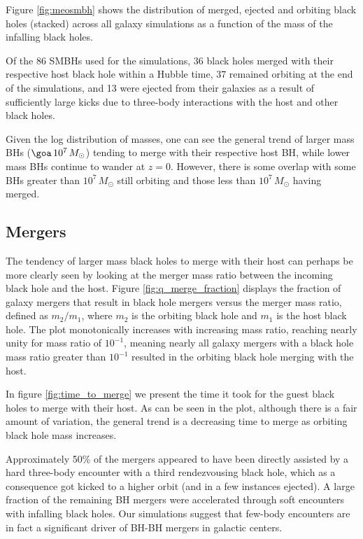 \documentclass[fleqn,usenatbib,useAMS]{mnras}
\begin{document}
Figure \ref{fig:meosmbh} shows the distribution of merged, ejected and orbiting black holes (stacked) across all galaxy simulations as a function of the mass of the infalling black holes.

Of the 86 SMBHs used for the simulations, 36 black holes merged with their respective host black hole within a Hubble time, 37 remained orbiting at the end of the simulations, and 13 were ejected from their galaxies as a result of sufficiently large kicks due to three-body interactions with the host and other black holes.

Given the log distribution of masses, one can see the general trend of larger mass BHs ($\goa\, 10^7\, M_{\odot}$) tending to merge with their respective host BH, while lower mass BHs continue to wander at $z=0$.  However, there is some overlap with some BHs greater than $10^7\, M_{\odot}$ still orbiting and those less than $10^7\, M_{\odot}$ having merged.

\subsection{Mergers}\label{sec:mergers}
The tendency of larger mass black holes to merge with their host can perhaps be more clearly seen by looking at the merger mass ratio between the incoming black hole and the host.  Figure \ref{fig:q_merge_fraction} displays the fraction of galaxy mergers that result in black hole mergers versus the merger mass ratio, defined as $m_2/m_1$, where $m_2$ is the orbiting black hole and $m_1$ is the host black hole.  The plot monotonically increases with increasing mass ratio, reaching nearly unity for mass ratio of $10^{-1}$, meaning nearly all galaxy mergers with a black hole mass ratio greater than $10^{-1}$ resulted in the orbiting black hole merging with the host.

In figure \ref{fig:time_to_merge} we present the time it took for the guest black holes to merge with their host.  As can be seen in the plot, although there is a fair amount of variation, the general trend is a decreasing time to merge as orbiting black hole mass increases.

Approximately 50\% of the mergers appeared to have been directly assisted by a hard three-body encounter with a third rendezvousing black hole, which as a consequence got kicked to a higher orbit (and in a few instances ejected).  A large fraction of the remaining BH mergers were accelerated through soft encounters with infalling black holes. Our simulations suggest that few-body encounters are in fact a significant driver of BH-BH mergers in galactic centers.
\end{document}
